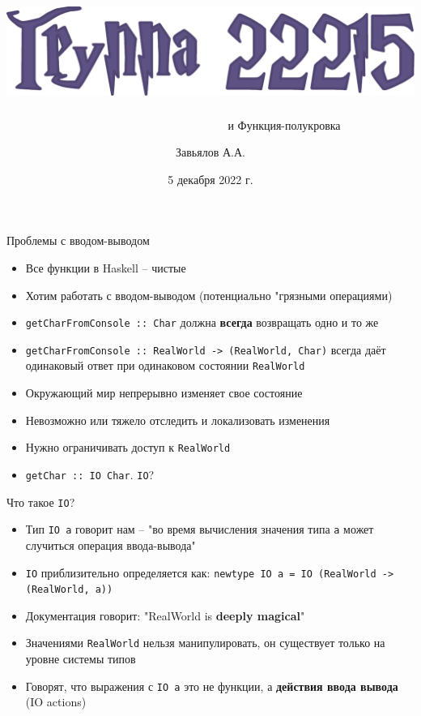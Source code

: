 \documentclass{beamer}
\title{~~~~\includegraphics[scale=0.5]{media/harry-potter-title.pdf}}
\subtitle{~~~~~~~~~~~~~~~~~~~~~~~~~~и Функция-полукровка}
\author{Завьялов А.А.}
\date{5 декабря 2022 г.}
\institute{Кафедра систем информатики ФИТ НГУ}
\newcommand{\hs}[1]{\texttt{#1}}
\begin{document}
  \maketitle
  \begin{frame}[fragile]{Проблемы с вводом-выводом}
\begin{itemize}
    \item Все функции в Haskell -- чистые
    \item Хотим работать с вводом-выводом (потенциально "грязными операциями)
    \item \hs{getCharFromConsole :: Char} должна \textbf{всегда} возвращать одно и то же
    \pause
    \item \hs{getCharFromConsole :: RealWorld -> (RealWorld, Char)} всегда даёт одинаковый
    ответ при одинаковом состоянии \hs{RealWorld}
    \item Окружающий мир непрерывно изменяет свое состояние
    \item Невозможно или тяжело отследить и локализовать изменения
    \item Нужно ограничивать доступ к \hs{RealWorld}
    \pause
    \item \hs{getChar :: IO Char}. \pause \hs{IO}?
\end{itemize}
  \end{frame}
  \begin{frame}{Что такое \texttt{IO}?}
      \begin{itemize}
          \item Тип \hs{IO a} говорит нам -- "во время вычисления значения типа \hs{a} может случиться операция ввода-вывода"
          \item \hs{IO} приблизительно определяется как:
                \hs{newtype IO a = IO (RealWorld -> (RealWorld, a))}
           \item Документация говорит: "RealWorld is \textbf{deeply magical}"
           \item Значениями \hs{RealWorld} нельзя манипулировать, он существует только
           на уровне системы типов
           \pause
           \item Говорят, что выражения с \hs{IO a} это не функции\pause, а \textbf{действия ввода вывода} (IO actions)
      \end{itemize}
  \end{frame}
\end{document}
